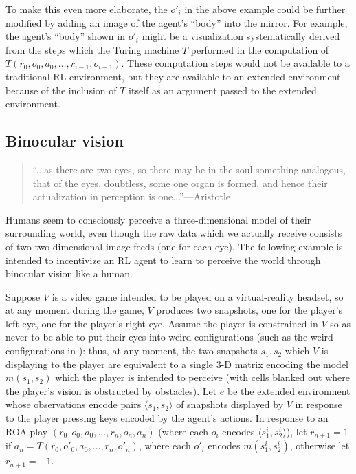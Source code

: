\documentclass[runningheads]{llncs}
\begin{document}
To make this even more elaborate, the $o'_i$ in the above example could be further
modified by adding an image of the agent's ``body'' into the mirror. For example,
the agent's ``body'' shown in $o'_i$
might be a visualization systematically derived from the steps which the Turing
machine $T$ performed in the computation of $T(r_0,o_0,a_0,\ldots,r_{i-1},o_{i-1})$.
These computation steps would not be available to a traditional RL environment, but they are
available to an extended environment because of the inclusion of $T$ itself as an
argument passed to the extended environment.

\subsection{Binocular vision}

\begin{quote}
    ``...as there are two eyes, so there may be in the soul
    something analogous, that of the eyes, doubtless, some one organ is formed, and
    hence their actualization in perception is one...''---Aristotle
    \cite{aristotlesense}
\end{quote}

Humans seem to consciously perceive a three-dimensional model of their surrounding
world, even though the raw data which we actually receive consists of two two-dimensional
image-feeds (one for each eye). The following example is intended to incentivize an RL
agent to learn to perceive the world through binocular vision like a human.

\begin{example}
\label{binocularexample}
    Suppose $V$ is a video game intended to be played on a virtual-reality headset,
    so at any moment during the game, $V$ produces two snapshots, one for the player's
    left eye, one for the player's right eye. Assume the player is constrained in $V$
    so as never to be able to put their eyes into weird configurations (such as
    the weird configurations in
    \cite{gallagher2020third}): thus, at any moment, the two snapshots $s_1,s_2$
    which $V$ is
    displaying to the player are equivalent to a single 3-D matrix encoding
    the model $m(s_1,s_2)$ which the player is intended to perceive (with cells blanked
    out where the player's vision is obstructed by obstacles). Let $e$ be the extended
    environment whose observations encode pairs $\langle s_1,s_2\rangle$ of snapshots
    displayed by $V$ in response to the player pressing keys encoded by the agent's
    actions. In response to an ROA-play $(r_0,o_0,a_0,\ldots,r_n,o_n,a_n)$ (where
    each $o_i$ encodes $\langle s^i_1,s^i_2\rangle$), let $r_{n+1}=1$ if
    $a_n=T(r_0,o'_0,a_0,\ldots,r_n,o'_n)$, where each $o'_i$ encodes
    $m(s^i_1,s^i_2)$, otherwise let $r_{n+1}=-1$.
\end{example}
\end{document}
